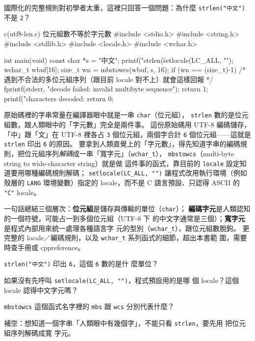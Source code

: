 國際化的完整規則對初學者太重，這裡只回答一個問題：為什麼
\texttt{strlen("中文")} 不是 \texttt{2}？

\begin{example}{c}{(utf8-len.c) 位元組數不等於字元數}
#include <stdio.h>
#include <string.h>
#include <stdlib.h>
#include <locale.h>
#include <wchar.h>

int main(void) {
    const char *s = "中文";
    printf("strlen(\"%

    setlocale(LC_ALL, "");
    wchar_t wbuf[16];
    size_t wn = mbstowcs(wbuf, s, 16);
    if (wn == (size_t)-1) {
        /* 遇到不合法的多位元組序列（跟目前 locale 對不上）就會這樣回報 */
        fprintf(stderr, "decode failed: invalid multibyte sequence\n");
        return 1;
    }
    printf("characters decoded: %
    return 0;
}
\end{example}


原始碼裡的字串常量在編譯器眼中就是一串 \texttt{char}（位元組），
\texttt{strlen} 數的是位元組數，跟人類眼中的「字元數」完全是兩件事。
這份原始碼用 UTF-8 編碼儲存，「中」跟「文」在 UTF-8 裡各占 \texttt{3}
個位元組，兩個字合計 \texttt{6} 個位元組——這就是 \texttt{strlen} 印出
\texttt{6} 的原因。 要拿到人類直覺上的「字元數」，得先知道字串的編碼規
則，把位元組序列\textit{解碼}成一串「寬字元」（\texttt{wchar\_t}），
\texttt{mbstowcs}（multi-byte string to wide-character string）就是做
這件事的函式，靠目前的 \texttt{locale} 設定知道要用哪種編碼規則解碼；
\texttt{setlocale(LC\_ALL, "")} 讓程式改用執行環境（例如殼層的
\texttt{LANG} 環境變數）指定的 locale，而不是 C 語言預設、只認得
ASCII 的 \texttt{"C"} locale。

一句話總結三個層次：\textbf{位元組}是儲存與傳輸的單位（\texttt{char}）；
\textbf{編碼字元}是人類認知的一個符號，可能占一到多個位元組（UTF-8 下
的中文字通常是三個）；\textbf{寬字元}是程式內部用來統一處理各種語言字
元的型別（\texttt{wchar\_t}），跟位元組數脫鉤。 更完整的
locale／編碼規則，以及 \texttt{wchar\_t} 系列函式的細節，超出本書範
圍，需要時查手冊或 cppreference。


\begin{drills}[label=drills:sl-i18n]
\item \texttt{strlen("中文")} 印出 \texttt{6}，這個 \texttt{6} 數的是什
麼單位？
\item 如果沒有先呼叫 \texttt{setlocale(LC\_ALL, "")}，程式預設用的是哪
個 locale？這個 locale 認得中文字元嗎？
\item \texttt{mbstowcs} 這個函式名字裡的 \texttt{mbs} 跟 \texttt{wcs}
分別代表什麼？
\item 補空：想知道一個字串「人類眼中有幾個字」，不能只看
\texttt{strlen}，要先用 \underline{\hspace{2em}} 把位元組序列解碼成寬
字元。
\end{drills}

